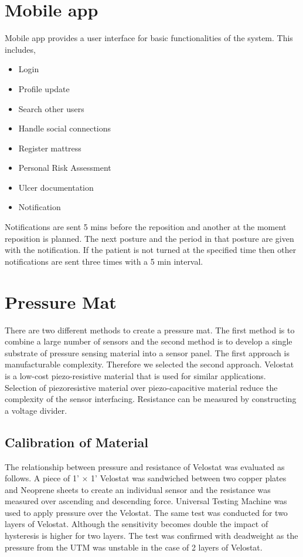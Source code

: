 \section{Mobile app} 

Mobile app provides a user interface for basic functionalities of the system. This includes,
\begin{itemize}
	\item Login
	\item Profile update
	\item Search other users
	\item Handle social connections
	\item Register mattress
	\item Personal Risk Assessment
	\item Ulcer documentation
	\item Notification
\end{itemize}

Notifications are sent 5 mins before the reposition and another at the moment reposition is planned. The next posture and the period in that posture are given with the notification. If the patient is not turned at the specified time then other notifications are sent three times with a 5 min interval.




\section{Pressure Mat}

There are two different methods to create a pressure mat. The first method is to combine a large number of sensors and the second method is to develop a single substrate of pressure sensing material into a sensor panel. The first approach is manufacturable complexity. Therefore we selected the second approach. Velostat\textsuperscript{\textregistered} is a low-cost piezo-resistive material that is used for similar applications. \cite{velostat1,velostat2,velsensor} Selection of piezoresistive material over piezo-capacitive material reduce the complexity of the sensor interfacing. Resistance can be measured by constructing a voltage divider. 


\subsection{Calibration of Material}

The relationship between pressure and resistance of Velostat was evaluated as follows. A piece of 1' $\times$ 1' Velostat was sandwiched between two copper plates and Neoprene sheets to create an individual sensor and the resistance was measured over ascending and descending force. 
 Universal Testing Machine was used to apply pressure over the Velostat. The same test was conducted for two layers of Velostat. Although the sensitivity becomes double the impact of hysteresis is higher for two layers. The test was confirmed with deadweight as the pressure from the UTM was unstable in the case of 2 layers of Velostat.

